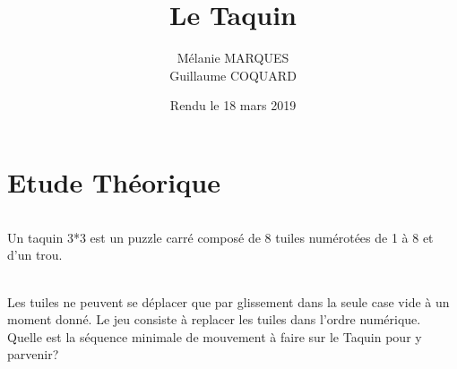 \documentclass[10pt,a4paper]{report}
\title{Le Taquin}
\author{Mélanie MARQUES \\ Guillaume COQUARD}
\date{Rendu le 18 mars 2019}
\begin{document}
\begin{titlepage}
	\maketitle
\end{titlepage}


\part{Etude Théorique}

\paragraph{} {Un taquin 3*3 est un puzzle carré composé de 8 tuiles numérotées de 1 à 8 et d’un trou.}

\paragraph{} {Les tuiles ne peuvent se déplacer que par glissement dans la seule case vide à un moment donné. Le jeu consiste à replacer les tuiles dans l’ordre numérique. Quelle est la séquence minimale de mouvement à faire sur le Taquin pour y parvenir?}
\end{document}

